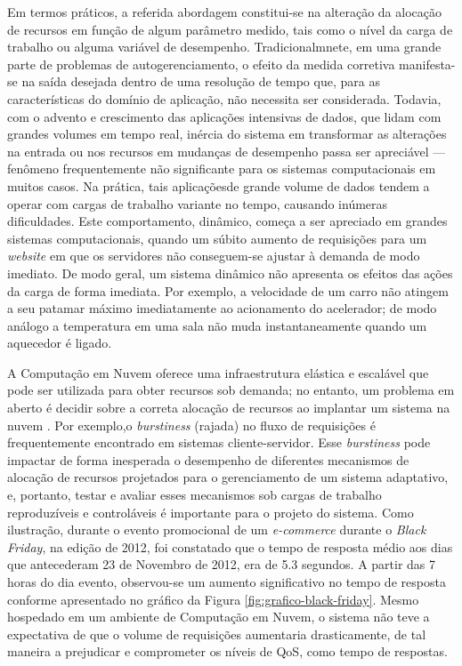 Em termos práticos, a referida abordagem constitui-se na alteração da alocação de recursos em função de algum parâmetro medido, tais como o nível da carga de trabalho ou alguma variável de desempenho.  Tradicionalmnete, em uma grande parte de problemas de autogerenciamento, o efeito da medida corretiva manifesta-se na saída desejada dentro de uma resolução de tempo que, para as características do domínio de aplicação, não necessita ser considerada.  Todavia, com o advento e crescimento das aplicações intensivas de dados, que lidam com grandes volumes em tempo real, inércia do sistema em transformar as alterações na entrada ou nos recursos em mudanças de desempenho passa ser apreciável --- fenômeno frequentemente não significante para os sistemas computacionais em muitos casos. Na prática, tais aplicaçõesde grande volume de dados tendem a operar com cargas de trabalho variante no tempo, causando inúmeras dificuldades.  Este comportamento, dinâmico, começa a ser apreciado em grandes sistemas computacionais, quando um súbito aumento de requisições para um \textit{website} em que os servidores não conseguem-se ajustar à demanda de modo imediato. De modo geral, um sistema dinâmico não apresenta os efeitos das ações da carga de forma imediata. Por exemplo, a velocidade de um carro não atingem a seu patamar máximo imediatamente ao acionamento do acelerador; de modo análogo a temperatura em uma sala não muda instantaneamente quando um aquecedor é ligado.

A Computação em Nuvem oferece uma infraestrutura elástica e escalável que pode ser utilizada para obter recursos sob demanda; no entanto, um problema em aberto é decidir sobre a correta alocação de recursos ao implantar um sistema na nuvem \cite{Cervino2012}. Por exemplo,o \textit{burstiness} (rajada) no fluxo de requisições é frequentemente encontrado em sistemas cliente-servidor. Esse \textit{burstiness} pode impactar de forma inesperada o desempenho de diferentes mecanismos de alocação de recursos projetados para o gerenciamento de um sistema adaptativo, e, portanto, testar e avaliar esses mecanismos sob cargas de trabalho reproduzíveis e controláveis é importante para o projeto do sistema.  Como ilustração, durante o evento promocional de um \textit{e-commerce} durante o \textit{Black Friday}, na edição de 2012, foi constatado que o tempo de resposta médio aos dias que antecederam 23 de Novembro de 2012, era de 5.3 segundos. A partir das 7 horas do dia evento, observou-se um aumento significativo no tempo de resposta conforme apresentado no gráfico da Figura \ref{fig:grafico-black-friday}. Mesmo hospedado em um ambiente de Computação em Nuvem, o sistema não teve a expectativa de que o volume de requisições aumentaria drasticamente, de tal maneira a prejudicar e comprometer os níveis de QoS, como tempo de respostas.


